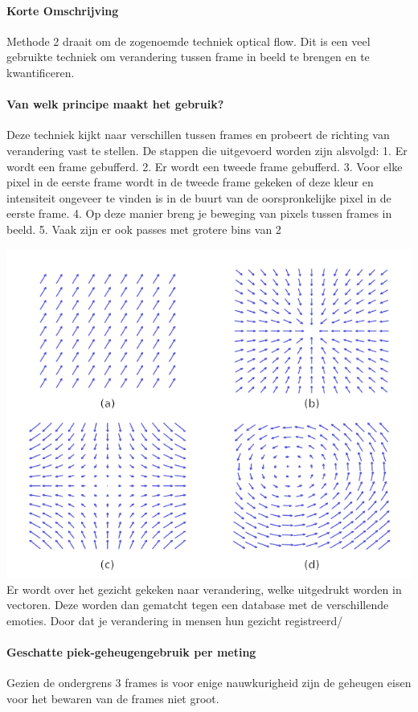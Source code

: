 \documentclass[11pt]{article}
\begin{document}
    \paragraph{Korte Omschrijving}
    Methode 2 draait om de zogenoemde techniek optical flow.
    Dit is een veel gebruikte techniek om verandering tussen frame in beeld te brengen en te kwantificeren.

    \paragraph{Van welk principe maakt het gebruik?}
    Deze techniek kijkt naar verschillen tussen frames en probeert de richting van verandering vast te stellen.
    De stappen die uitgevoerd worden zijn alsvolgd:
    1. Er wordt een frame gebufferd.
    2. Er wordt een tweede frame gebufferd.
    3. Voor elke pixel in de eerste frame wordt in de tweede frame gekeken of deze kleur en intensiteit ongeveer te vinden is in de buurt van de oorspronkelijke pixel in de eerste frame.
    4. Op deze manier breng je beweging van pixels tussen frames in beeld.
    5. Vaak zijn er ook passes met grotere bins van 2
    
    \includegraphics[height=0.2\textheight]{Images/Vector-field-examples.jpg}
    Er wordt over het gezicht gekeken naar verandering, welke uitgedrukt worden in vectoren.
    Deze worden dan gematcht tegen een database met de verschillende emoties.
    Door dat je verandering in mensen hun gezicht registreerd/

    \paragraph{Geschatte piek-geheugengebruik per meting}
    Gezien de ondergrens 3 frames is voor enige nauwkurigheid zijn de geheugen eisen voor het bewaren van de frames niet groot.
\end{document}
